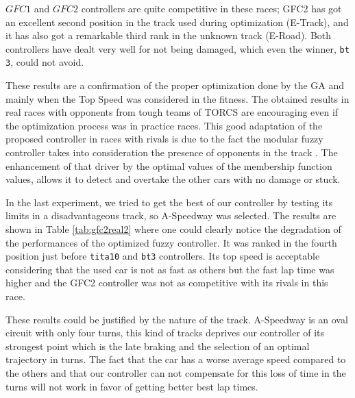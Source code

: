\documentclass[sigconf]{acmart}
\begin{document}
$GFC1$ and $GFC2$ controllers are quite competitive in these races; 
GFC2 has got an excellent second position in the track used during optimization (E-Track), and it has also got a remarkable third rank in the unknown track (E-Road). 
Both controllers have dealt very well for not being damaged, which even the winner, {\tt bt 3}, could not avoid. 

These results are a confirmation of the proper optimization done by the GA and mainly when the Top Speed was considered in the fitness. 
The obtained results in real races with opponents from tough teams of TORCS are encouraging even if the optimization process was in practice races.
This good adaptation of the proposed controller in races with rivals is due to the fact the modular fuzzy controller takes into consideration the presence of opponents in the track \cite{evo17}. 
The enhancement of that driver by the optimal values of the membership function values, allows it to detect and overtake the other cars with no damage or stuck.

In the last experiment, we tried to get the best of our controller by testing its limits in a disadvantageous track, so A-Speedway was selected. 
The results are shown in Table \ref{tab:gfc2real2} where one
could clearly notice the degradation of the performances of the
optimized fuzzy controller. It was ranked in the fourth position just before {\tt tita10} and {\tt bt3} controllers. Its top speed is acceptable considering that the used car is not as fast as others but the fast lap time was higher and the GFC2 controller was not as competitive with its rivals in this race. 

These results could be justified by the nature of the track. A-Speedway is an oval circuit with only four turns, this kind of tracks deprives our controller of its strongest point which is the late braking and the selection of an optimal trajectory in turns. 
The fact that the car has a worse average speed compared to the others and that our controller can not compensate for this loss of time in the turns will not work in favor of getting better best lap times.  
\end{document}
